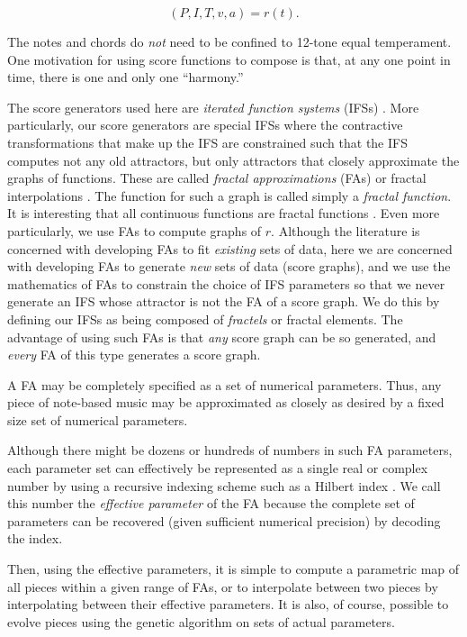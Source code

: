 \documentclass[english,11pt,letterpaper,onecolumn]{scrartcl}
\numberwithin{equation}{section}
\begin{document}
$$(P, I, T, v, a) = r(t).$$ 

\noindent The notes and chords do \textit{not} need to be confined to 12-tone 
equal temperament. One motivation for using score functions to compose is that, 
at any one point in time, there is one and only one ``harmony.''

The score generators used here are \textit{iterated function systems} (IFSs) 
\cite{barnsley1985iterated, 10.2307/24893080, fractalseverywhere}. More 
particularly, our score generators are special IFSs where the contractive 
transformations that make up the IFS are constrained such that the IFS computes 
not any old attractors, but only attractors that closely approximate the graphs 
of functions. These are called \textit{fractal approximations} (FAs) or fractal 
interpolations \cite{Barnsley1986, fractalseverywhere, navascues2014fractal}. 
The function for such a graph is called simply a \textit{fractal function}. It 
is interesting that all continuous functions are fractal functions 
\cite{2016arXiv161001369B}. Even more particularly, we use FAs to compute 
graphs of $r$. Although the literature is concerned with 
developing FAs to fit \textit{existing} sets of data, here we are concerned 
with developing FAs to generate \textit{new} sets of data (score graphs), and 
we use the mathematics of FAs to constrain the choice of IFS parameters so that 
we never generate an IFS whose attractor is not the FA of a score graph. We do 
this by defining our IFSs as being composed of \textit{fractels} or fractal 
elements. The advantage of using such FAs is that \textit{any} score graph can 
be so generated, and \textit{every} FA of this type generates a score graph.

A FA may be completely specified as a set of numerical parameters. Thus, any 
piece of note-based music may be approximated as closely as desired by a fixed 
size set of numerical parameters.

Although there might be dozens or hundreds of numbers in such FA parameters, 
each parameter set can effectively be represented as a single real or complex 
number by using a recursive indexing scheme such as a Hilbert index 
\cite{hamilton2006compact}. We call this number the \textit{effective 
parameter} of the FA because the complete set of parameters can be recovered 
(given sufficient numerical precision) by decoding the index. 

Then, using the effective parameters, it is simple to compute a parametric map 
of all pieces within a given range of FAs, or to interpolate between two pieces 
by interpolating between their effective parameters. It is also, of course, 
possible to evolve pieces using the genetic algorithm on sets of actual 
parameters.
\end{document}
